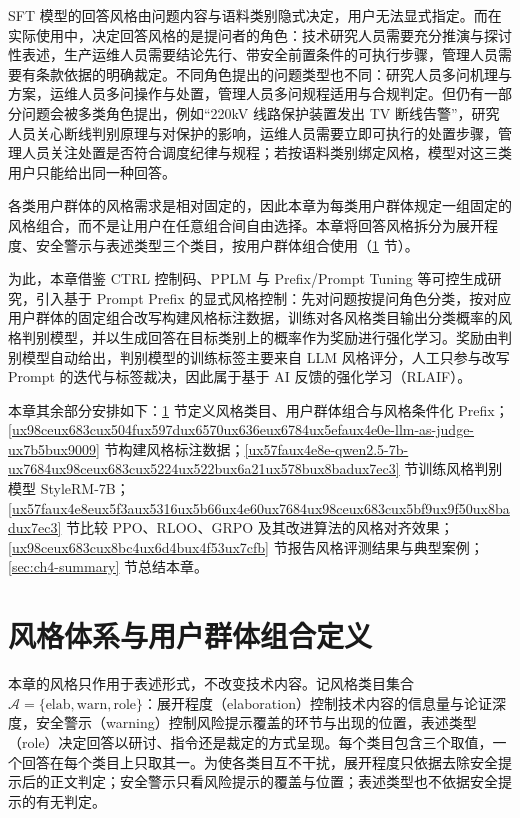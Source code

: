 \documentclass[fontset=fandol,type=master,campus=shenzhen,etitleauto=true]{hithesisbook}
\begin{document}
SFT 模型的回答风格由问题内容与语料类别隐式决定，用户无法显式指定。而在实际使用中，决定回答风格的是提问者的角色：技术研究人员需要充分推演与探讨性表述，生产运维人员需要结论先行、带安全前置条件的可执行步骤，管理人员需要有条款依据的明确裁定。不同角色提出的问题类型也不同：研究人员多问机理与方案，运维人员多问操作与处置，管理人员多问规程适用与合规判定。但仍有一部分问题会被多类角色提出，例如“220kV 线路保护装置发出 TV 断线告警”，研究人员关心断线判别原理与对保护的影响，运维人员需要立即可执行的处置步骤，管理人员关注处置是否符合调度纪律与规程；若按语料类别绑定风格，模型对这三类用户只能给出同一种回答。

各类用户群体的风格需求是相对固定的，因此本章为每类用户群体规定一组固定的风格组合，而不是让用户在任意组合间自由选择。本章将回答风格拆分为展开程度、安全警示与表述类型三个类目，按用户群体组合使用（\ref{ux4e09ux7c7bux98ceux683c-prefix-ux5b9aux4e49} 节）。

为此，本章借鉴 CTRL 控制码、PPLM 与 Prefix/Prompt Tuning 等可控生成研究\cite{ref36,ref37,ref38,ref39}，引入基于 Prompt Prefix 的显式风格控制：先对问题按提问角色分类，按对应用户群体的固定组合改写构建风格标注数据，训练对各风格类目输出分类概率的风格判别模型，并以生成回答在目标类别上的概率作为奖励进行强化学习。奖励由判别模型自动给出，判别模型的训练标签主要来自 LLM 风格评分，人工只参与改写 Prompt 的迭代与标签裁决，因此属于基于 AI 反馈的强化学习（RLAIF）\cite{ref44,ref90}。

本章其余部分安排如下：\ref{ux4e09ux7c7bux98ceux683c-prefix-ux5b9aux4e49} 节定义风格类目、用户群体组合与风格条件化 Prefix；\ref{ux98ceux683cux504fux597dux6570ux636eux6784ux5efaux4e0e-llm-as-judge-ux7b5bux9009} 节构建风格标注数据；\ref{ux57faux4e8e-qwen2.5-7b-ux7684ux98ceux683cux5224ux522bux6a21ux578bux8badux7ec3} 节训练风格判别模型 StyleRM-7B；\ref{ux57faux4e8eux5f3aux5316ux5b66ux4e60ux7684ux98ceux683cux5bf9ux9f50ux8badux7ec3} 节比较 PPO、RLOO、GRPO 及其改进算法的风格对齐效果；\ref{ux98ceux683cux8bc4ux6d4bux4f53ux7cfb} 节报告风格评测结果与典型案例；\ref{sec:ch4-summary} 节总结本章。

\section{风格体系与用户群体组合定义}\label{ux4e09ux7c7bux98ceux683c-prefix-ux5b9aux4e49}

本章的风格只作用于表述形式，不改变技术内容。记风格类目集合 $\mathcal{A} = \{\text{elab}, \text{warn}, \text{role}\}$：展开程度（elaboration）控制技术内容的信息量与论证深度，安全警示（warning）控制风险提示覆盖的环节与出现的位置，表述类型（role）决定回答以研讨、指令还是裁定的方式呈现。每个类目包含三个取值，一个回答在每个类目上只取其一。为使各类目互不干扰，展开程度只依据去除安全提示后的正文判定；安全警示只看风险提示的覆盖与位置；表述类型也不依据安全提示的有无判定。
\end{document}
